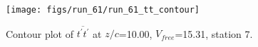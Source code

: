 \begin{figure}[H]
\centering
\texttt{[image: figs/run\_61/run\_61\_tt\_contour]}
\caption{Contour plot of $\overline{t^\prime t^\prime}$ at $z/c$=10.00, $V_{free}$=15.31, station 7.}
\end{figure}


